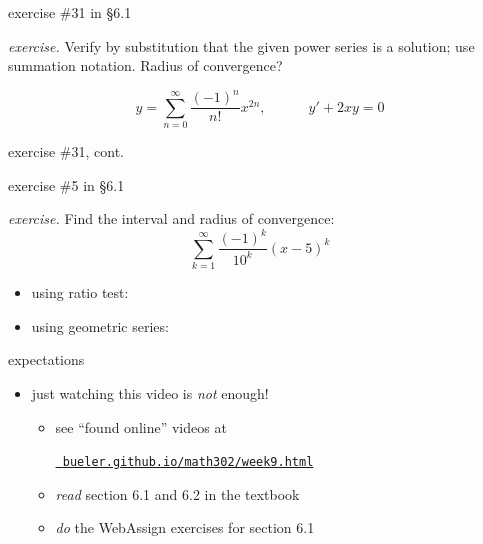 \documentclass[urlcolor=blue,dvipsnames]{beamer}
\begin{document}
\begin{frame}{exercise \#31 in \S 6.1}

\noindent \emph{exercise.}  Verify by substitution that the given power series is a solution; use summation notation.  Radius of convergence?

$$y=\sum_{n=0}^\infty \frac{(-1)^n}{n!} x^{2n}, \qquad\quad y'+2xy=0$$

\vspace{50mm}
\end{frame}


\begin{frame}{exercise \#31, cont.}

\end{frame}


\begin{frame}{exercise \#5 in \S 6.1}

\noindent \emph{exercise.}  Find the interval and radius of convergence:
    $$\sum_{k=1}^\infty \frac{(-1)^k}{10^k} (x-5)^k$$

\begin{itemize}
\item using ratio test:

\vspace{20mm}
\item using geometric series:

\vspace{20mm}
\end{itemize}
\end{frame}


\begin{frame}{expectations}

\begin{itemize}
\item just watching this video is \emph{not} enough!
     \begin{itemize}
     \item see ``found online'' videos at

     \centerline{\href{https://bueler.github.io/math302/week9.html}{\tt \color{cyan} bueler.github.io/math302/week9.html}}
     \item \emph{read} section 6.1 and 6.2 in the textbook
     \item \emph{do} the WebAssign exercises for section 6.1
     \end{itemize}
\end{itemize}
\end{frame}
\end{document}
